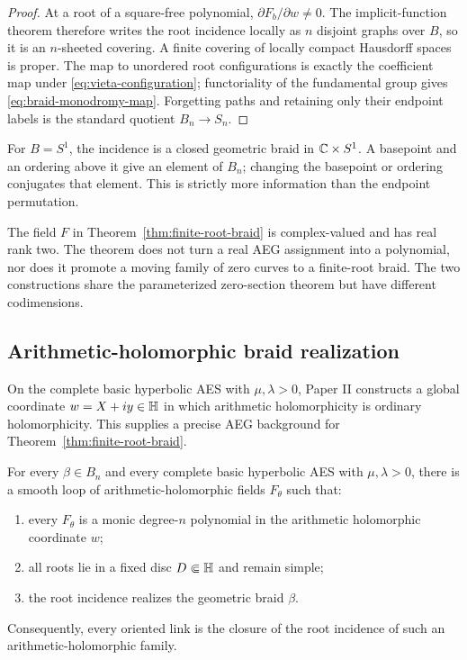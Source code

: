 \begin{proof}
At a root of a square-free polynomial,
$\partial F_b/\partial w\ne0$.  The implicit-function theorem therefore writes the
root incidence locally as $n$ disjoint graphs over $B$, so it is an $n$-sheeted
covering.  A finite covering of locally compact Hausdorff spaces is proper.  The
map to unordered root configurations is exactly the coefficient map under
\eqref{eq:vieta-configuration}; functoriality of the fundamental group gives
\eqref{eq:braid-monodromy-map}.  Forgetting paths and retaining only their endpoint
labels is the standard quotient $B_n\to S_n$.
\end{proof}

For $B=S^1$, the incidence is a closed geometric braid in
$\mathbb{C}\times S^1$.  A basepoint and an ordering above it give an element of $B_n$;
changing the basepoint or ordering conjugates that element.  This is strictly more
information than the endpoint permutation.

\begin{warning}
\label{warn:rank-one-not-braid}
The field $F$ in Theorem~\ref{thm:finite-root-braid} is complex-valued and has real
rank two.  The theorem does not turn a real AEG assignment into a polynomial, nor
does it promote a moving family of zero curves to a finite-root braid.  The two
constructions share the parameterized zero-section theorem but have different
codimensions.
\end{warning}

\subsection{Arithmetic-holomorphic braid realization}

On the complete basic hyperbolic AES with $\mu,\lambda>0$, Paper II constructs a global coordinate
$w=X+iy\in\mathbb{H}$ in which arithmetic holomorphicity is ordinary holomorphicity.
This supplies a precise AEG background for Theorem~\ref{thm:finite-root-braid}.

\begin{theorem}
\label{thm:aeg-braid-realization}
For every $\beta\in B_n$ and every complete basic hyperbolic AES with
$\mu,\lambda>0$, there is a smooth loop of arithmetic-holomorphic fields
$F_\theta$ such that:
\begin{enumerate}
\item every $F_\theta$ is a monic degree-$n$ polynomial in the arithmetic
holomorphic coordinate $w$;
\item all roots lie in a fixed disc $D\Subset\mathbb{H}$ and remain simple;
\item the root incidence realizes the geometric braid $\beta$.
\end{enumerate}
Consequently, every oriented link is the closure of the root incidence of such an
arithmetic-holomorphic family.
\end{theorem}

